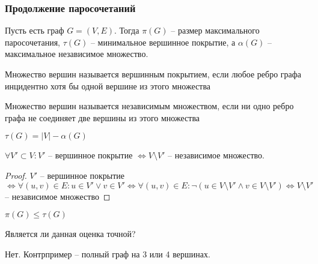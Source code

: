 \subsubsection{Продолжение паросочетаний}

\begin{definition}
    Пусть есть граф $G = (V, E)$. Тогда $\pi(G)$ -- размер максимального паросочетания, $\tau(G)$ -- минимальное вершинное покрытие, а $\alpha(G)$ -- максимальное независимое множество.
\end{definition}

\begin{definition}
    Множество вершин называется вершинным покрытием, если любое ребро графа инцидентно хотя бы одной вершине из этого множества
\end{definition}

\begin{definition}
    Множество вершин называется независимым множеством, если ни одно ребро графа не соединяет две вершины из этого множества
\end{definition}

\begin{proposition}
    $\tau(G) = |V| - \alpha(G)$
\end{proposition}

\begin{proposition}
    $\forall V' \subset V: V'$ -- вершинное покрытие $\Longleftrightarrow V \setminus V'$ -- независимое множество.
\end{proposition}

\begin{proof}
    $V'$ -- вершинное покрытие $\Longleftrightarrow \forall (u, v) \in E: u \in V' \lor v \in V' \Longleftrightarrow \forall (u, v) \in E: \lnot (u \in V \setminus V' \land v \in V \setminus V') \Longleftrightarrow V \setminus V'$ -- независимое множество
\end{proof}

\begin{proposition}
    $\pi(G) \leq \tau(G)$
\end{proposition}

\begin{problem}
    Является ли данная оценка точной?
\end{problem}

\begin{solution}
    Нет. Контрпример -- полный граф на 3 или 4 вершинах.
\end{solution}


